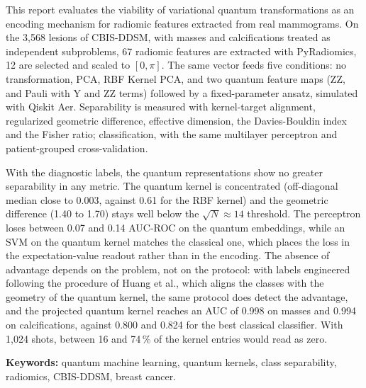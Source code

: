 This report evaluates the viability of variational quantum transformations as an encoding mechanism for radiomic features extracted from real mammograms. On the 3,568 lesions of CBIS-DDSM, with masses and calcifications treated as independent subproblems, 67 radiomic features are extracted with PyRadiomics, 12 are selected and scaled to $[0,\pi]$. The same vector feeds five conditions: no transformation, PCA, RBF Kernel PCA, and two quantum feature maps (ZZ, and Pauli with Y and ZZ terms) followed by a fixed-parameter ansatz, simulated with Qiskit Aer. Separability is measured with kernel-target alignment, regularized geometric difference, effective dimension, the Davies-Bouldin index and the Fisher ratio; classification, with the same multilayer perceptron and patient-grouped cross-validation.

With the diagnostic labels, the quantum representations show no greater separability in any metric. The quantum kernel is concentrated (off-diagonal median close to 0.003, against 0.61 for the RBF kernel) and the geometric difference (1.40 to 1.70) stays well below the $\sqrt{N}\approx 14$ threshold. The perceptron loses between 0.07 and 0.14 AUC-ROC on the quantum embeddings, while an SVM on the quantum kernel matches the classical one, which places the loss in the expectation-value readout rather than in the encoding. The absence of advantage depends on the problem, not on the protocol: with labels engineered following the procedure of Huang et al., which aligns the classes with the geometry of the quantum kernel, the same protocol does detect the advantage, and the projected quantum kernel reaches an AUC of 0.998 on masses and 0.994 on calcifications, against 0.800 and 0.824 for the best classical classifier. With 1,024 shots, between 16 and 74\,\% of the kernel entries would read as zero.

\medskip
\noindent\textbf{Keywords:} quantum machine learning, quantum kernels, class separability, radiomics, CBIS-DDSM, breast cancer.
